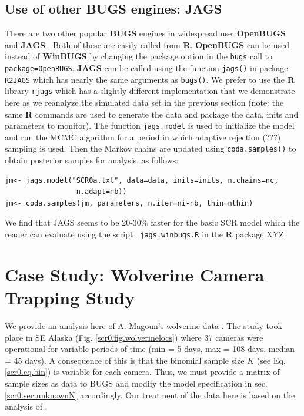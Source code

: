 \subsection{Use of other BUGS engines: JAGS}

There are two other popular {\bf BUGS} engines in widespread use: {\bf OpenBUGS}
\citep{thomas_etal:2006} and {\bf JAGS} \citep{plummer:2003}. Both of these
are easily called from {\bf R}. {\bf OpenBUGS} can be used instead of
{\bf WinBUGS} by
changing the package option in the \mbox{\tt bugs} call to \mbox{\tt package=OpenBUGS}.
{\bf JAGS} can be called using the function \mbox{\tt jags()} in
package \mbox{\tt R2JAGS} which
has nearly the same arguments as \mbox{\tt bugs()}.  We prefer to use
the {\bf R}
library \mbox{\tt rjags} \citep{plummer:2009} which has a slightly different
implementation that we demonstrate here as we reanalyze the simulated
data set in the previous section (note: the same {\bf R} commands are used
to generate the data and package the data, inits and parameters to
monitor). The function \mbox{\tt jags.model} is used to initialize the model and
run the MCMC algorithm for a period in which adaptive rejection (???)
sampling is used. Then the Markov chains are updated using
\mbox{\tt coda.samples()} to obtain posterior samples for analysis, as follows:
\begin{verbatim}
jm<- jags.model("SCR0a.txt", data=data, inits=inits, n.chains=nc,
                 n.adapt=nb))
jm<- coda.samples(jm, parameters, n.iter=ni-nb, thin=nthin)
\end{verbatim}
We find that JAGS seems to be 20-30\% faster for the basic SCR model
which the reader can evaluate using the script \mbox{\tt
  jags.winbugs.R} in the {\bf R} package XYZ. 


\section{Case Study: Wolverine Camera Trapping Study}
\label{scr0.sec.wolverine}

We provide an analysis here of A. Magoun's wolverine data
\citep{magoun_etal:2011, royle_etal:2011jwm}. The study took place in SE
Alaska (Fig. \ref{scr0.fig.wolverinelocs}) where 37 cameras were
operational for variable periods of time (min = 5 days, max = 108
days, median = 45 days).  A consequence of this is that the binomial
sample size $K$ (see Eq. \ref{scr0.eq.bin})
 is variable for each camera. Thus, we
must provide a matrix of sample sizes as data to BUGS and modify the
model specification in sec. \ref{scr0.sec.unknownN}
accordingly. Our treatment of the
data here is based on the analysis of  \citet{royle_etal:2011jwm}.

